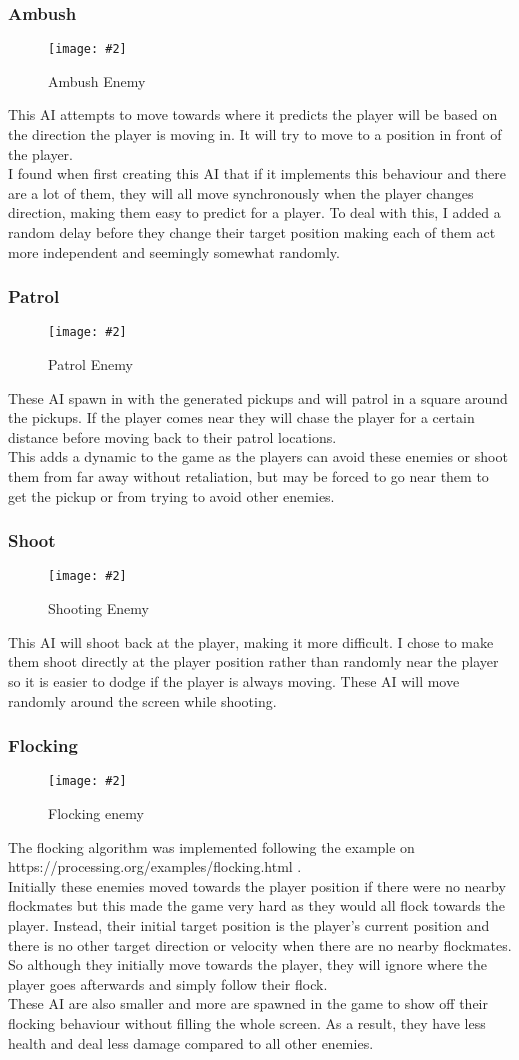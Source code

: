 \documentclass{article}
\newcommand{\n}[0]{\\[\baselineskip]}
\newcommand{\figimg}[3]{
  \begin{figure}[H]
    \centering
    \texttt{[image: \#2]}
    \caption{#3}
  \end{figure}
  \noindent 
}
\begin{document}
\subsubsection{Ambush}
\figimg{0.1}{imgs/AmbushEnemy.png}{Ambush Enemy}
This AI attempts to move towards where it predicts the player will be based on the direction the player is moving in. It will try to move to a position in front of the player. 
\n
I found when first creating this AI that if it implements this behaviour and there are a lot of them, they will all move synchronously when the player changes direction, making them easy to predict for a player. To deal with this, I added a random delay before they change their target position making each of them act more independent and seemingly somewhat randomly.

\subsubsection{Patrol}
\figimg{0.1}{imgs/PatrolEnemy.png}{Patrol Enemy}
These AI spawn in with the generated pickups and will patrol in a square around the pickups. If the player comes near they will chase the player for a certain distance before moving back to their patrol locations.
\n
This adds a dynamic to the game as the players can avoid these enemies or shoot them from far away without retaliation, but may be forced to go near them to get the pickup or from trying to avoid other enemies.

\subsubsection{Shoot}
\figimg{0.1}{imgs/ShootEnemy.png}{Shooting Enemy}
This AI will shoot back at the player, making it more difficult. I chose to make them shoot directly at the player position rather than randomly near the player so it is easier to dodge if the player is always moving. These AI will move randomly around the screen while shooting.

\subsubsection{Flocking}
\figimg{0.1}{imgs/FlockingEnemy.png}{Flocking enemy}
The flocking algorithm was implemented following the example on https://processing.org/examples/flocking.html \cite{flocking}. 
\n
Initially these enemies moved towards the player position if there were no nearby flockmates but this made the game very hard as they would all flock towards the player. Instead, their initial target position is the player's current position and there is no other target direction or velocity when there are no nearby flockmates. So although they initially move towards the player, they will ignore where the player goes afterwards and simply follow their flock.
\n
These AI are also smaller and more are spawned in the game to show off their flocking behaviour without filling the whole screen. As a result, they have less health and deal less damage compared to all other enemies.
\end{document}
